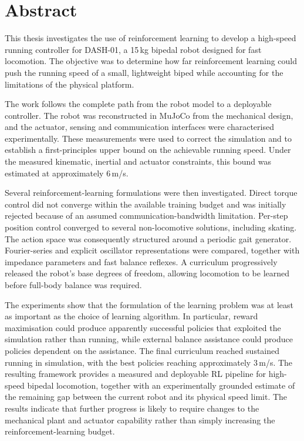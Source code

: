 \documentclass[a4paper, 11 pt]{article}
\begin{document}
{ %

\newpage
\section*{Abstract}

This thesis investigates the use of reinforcement learning to develop a high-speed running controller for DASH-01, a 15\,kg bipedal robot designed for fast locomotion. The objective was to determine how far reinforcement learning could push the running speed of a small, lightweight biped while accounting for the limitations of the physical platform.

The work follows the complete path from the robot model to a deployable controller. The robot was reconstructed in MuJoCo from the mechanical design, and the actuator, sensing and communication interfaces were characterised experimentally. These measurements were used to correct the simulation and to establish a first-principles upper bound on the achievable running speed. Under the measured kinematic, inertial and actuator constraints, this bound was estimated at approximately 6\,m/s.

Several reinforcement-learning formulations were then investigated. Direct torque control did not converge within the available training budget and was initially rejected because of an assumed communication-bandwidth limitation. Per-step position control converged to several non-locomotive solutions, including skating. The action space was consequently structured around a periodic gait generator. Fourier-series and explicit oscillator representations were compared, together with impedance parameters and fast balance reflexes. A curriculum progressively released the robot's base degrees of freedom, allowing locomotion to be learned before full-body balance was required.

The experiments show that the formulation of the learning problem was at least as important as the choice of learning algorithm. In particular, reward maximisation could produce apparently successful policies that exploited the simulation rather than running, while external balance assistance could produce policies dependent on the assistance. The final curriculum reached sustained running in simulation, with the best policies reaching approximately 3\,m/s.
The resulting framework provides a measured and deployable RL pipeline for high-speed bipedal locomotion, together with an experimentally grounded estimate of the remaining gap between the current robot and its physical speed limit. The results indicate that further progress is likely to require changes to the mechanical plant and actuator capability rather than simply increasing the reinforcement-learning budget.

}
\end{document}
